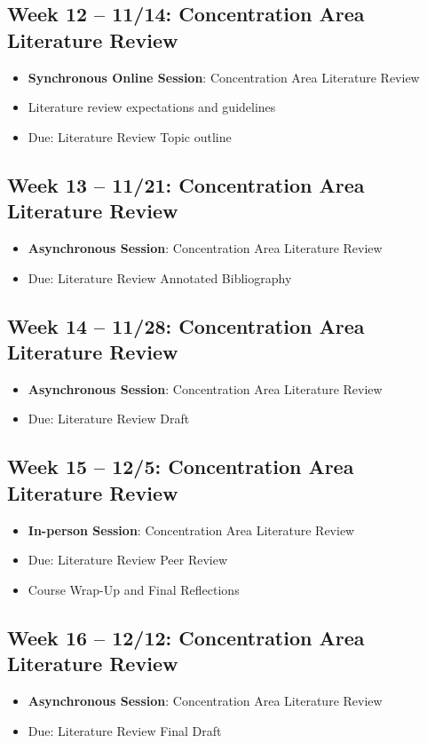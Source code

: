 \documentclass[12pt, letterpaper]{article}
\begin{document}
\subsection*{Week 12 -- 11/14: Concentration Area Literature Review}
\begin{itemize}
    \item \textbf{Synchronous Online Session}: Concentration Area Literature Review
    \item Literature review expectations and guidelines
    \item Due: Literature Review Topic outline
\end{itemize}

\subsection*{Week 13 -- 11/21: Concentration Area Literature Review}
\begin{itemize}
    \item \textbf{Asynchronous Session}: Concentration Area Literature Review
    \item Due: Literature Review Annotated Bibliography
\end{itemize}

\subsection*{Week 14 -- 11/28: Concentration Area Literature Review}
\begin{itemize}
    \item \textbf{Asynchronous Session}: Concentration Area Literature Review
    \item Due: Literature Review Draft
\end{itemize}

\subsection*{Week 15 -- 12/5: Concentration Area Literature Review}
\begin{itemize}
    \item \textbf{In-person Session}: Concentration Area Literature Review
    \item Due: Literature Review Peer Review
    \item Course Wrap-Up and Final Reflections
\end{itemize}

\subsection*{Week 16 -- 12/12: Concentration Area Literature Review}
\begin{itemize}
    \item \textbf{Asynchronous Session}: Concentration Area Literature Review
    \item Due: Literature Review Final Draft
\end{itemize}


            \singlespace
            
            
            
\end{document}
